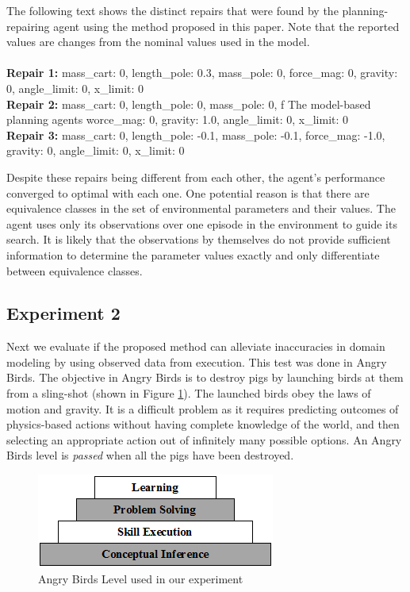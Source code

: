 \documentclass[letterpaper]{article} %
\newenvironment{console}{\ttfamily}{\par}
\begin{document}
The following text shows the distinct repairs that were found by the planning-repairing agent using the method proposed in this paper. Note that the reported values are changes from the nominal values used in the model. \\
\\
\begin{console}
     \textbf{Repair 1:} {mass\_cart: 0, length\_pole: 0.3, mass\_pole: 0, force\_mag: 0, gravity: 0, angle\_limit: 0, x\_limit: 0} \\
    \textbf{Repair 2:} {mass\_cart: 0, length\_pole: 0, mass\_pole: 0, f
The model-based planning agents worce\_mag: 0, gravity: 1.0, angle\_limit: 0, x\_limit: 0}
    \\
    \textbf{Repair 3:} {mass\_cart: 0, length\_pole: -0.1, mass\_pole: -0.1, force\_mag: -1.0, gravity: 0, angle\_limit: 0, x\_limit: 0}
\end{console}
\smallskip
Despite these repairs being different from each other, the agent's performance converged to optimal with each one. One potential reason is that there are equivalence classes in the set of environmental parameters and their values. The agent uses only its observations over one episode in the environment to guide its search. It is likely that the observations by themselves do not provide sufficient information to determine the parameter values exactly and only differentiate between equivalence classes.

\subsection{Experiment 2}
Next we evaluate if the proposed method can alleviate inaccuracies in domain modeling by using observed data from execution. This test was done in Angry Birds. The objective in Angry Birds is to destroy pigs by launching birds at them from a sling-shot (shown in Figure \ref{fig:ab_level}). The launched birds obey the laws of motion and gravity. It is a difficult problem as it requires predicting outcomes of physics-based actions without having complete knowledge of the world, and then selecting an appropriate action out of infinitely many possible options. An Angry Birds level is \emph{passed} when all the pigs have been destroyed.

\begin{figure}
    \centering
    \includegraphics[width=0.9\columnwidth]{cascade.png}
    \caption{Angry Birds Level used in our experiment}
    \label{fig:ab_level}
\end{figure}
\end{document}
